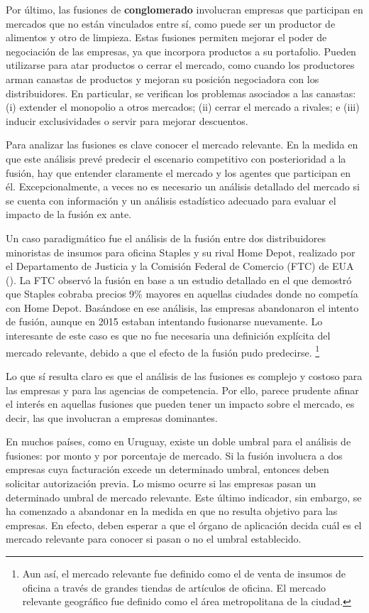 \documentclass[
  12pt,
  spanish,
]{book}
\begin{document}
Por último, las fusiones de \textbf{conglomerado} involucran empresas que participan en mercados que no están vinculados entre sí, como puede ser un productor de alimentos y otro de limpieza. Estas fusiones permiten mejorar el poder de negociación de las empresas, ya que incorpora productos a su portafolio. Pueden utilizarse para atar productos o cerrar el mercado, como cuando los productores arman canastas de productos y mejoran su posición negociadora con los distribuidores. En particular, se verifican los problemas asociados a las canastas: (i) extender el monopolio a otros mercados; (ii) cerrar el mercado a rivales; e (iii) inducir exclusividades o servir para mejorar descuentos.

Para analizar las fusiones es clave conocer el mercado relevante. En la medida en que este análisis prevé predecir el escenario competitivo con posterioridad a la fusión, hay que entender claramente el mercado y los agentes que participan en él. Excepcionalmente, a veces no es necesario un análisis detallado del mercado si se cuenta con información y un análisis estadístico adecuado para evaluar el impacto de la fusión ex ante.

Un caso paradigmático fue el análisis de la fusión entre dos distribuidores minoristas de insumos para oficina Staples y su rival Home Depot, realizado por el Departamento de Justicia y la Comisión Federal de Comercio (FTC) de EUA (\citet{Baker1999}). La FTC observó la fusión en base a un estudio detallado en el que demostró que Staples cobraba precios 9\% mayores en aquellas ciudades donde no competía con Home Depot. Basándose en ese análisis, las empresas abandonaron el intento de fusión, aunque en 2015 estaban intentando fusionarse nuevamente. Lo interesante de este caso es que no fue necesaria una definición explícita del mercado relevante, debido a que el efecto de la fusión pudo predecirse.
\footnote{Aun así, el mercado relevante fue definido como el de venta de insumos de oficina a través de grandes tiendas de artículos de oficina. El mercado relevante geográfico fue definido como el área metropolitana de la ciudad.}

Lo que sí resulta claro es que el análisis de las fusiones es complejo y costoso para las empresas y para las agencias de competencia. Por ello, parece prudente afinar el interés en aquellas fusiones que pueden tener un impacto sobre el mercado, es decir, las que involucran a empresas dominantes.

En muchos países, como en Uruguay, existe un doble umbral para el análisis de fusiones: por monto y por porcentaje de mercado. Si la fusión involucra a dos empresas cuya facturación excede un determinado umbral, entonces deben solicitar autorización previa. Lo mismo ocurre si las empresas pasan un determinado umbral de mercado relevante. Este último indicador, sin embargo, se ha comenzado a abandonar en la medida en que no resulta objetivo para las empresas. En efecto, deben esperar a que el órgano de aplicación decida cuál es el mercado relevante para conocer si pasan o no el umbral establecido.
\end{document}
